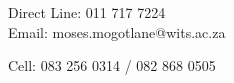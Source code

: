 




\begin{no}


Direct Line: 011 717 7224\\
Email: moses.mogotlane@wits.ac.za

\divider




\begin{no}
Cell: 083 256 0314 / 082 868 0505\\
\end{no}

\end{no}

